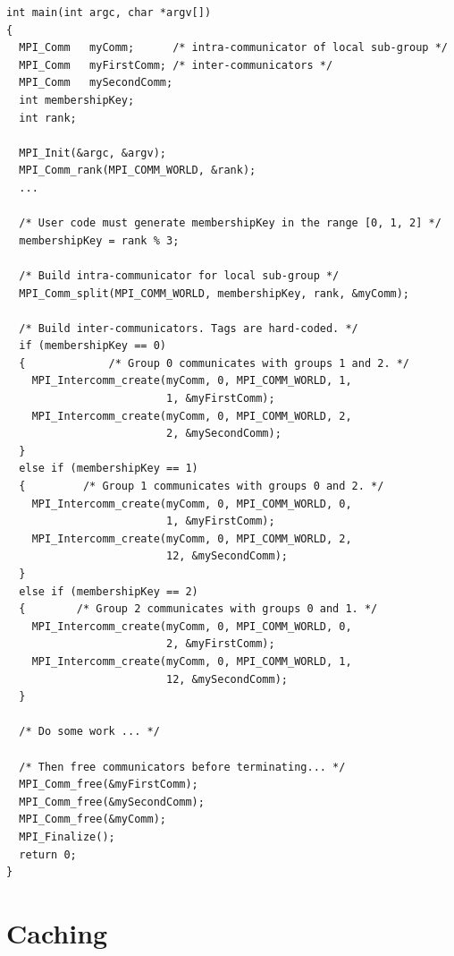 \begin{example}
%
\begin{lstlisting}[language={[MPI]C}]
int main(int argc, char *argv[])
{
  MPI_Comm   myComm;      /* intra-communicator of local sub-group */
  MPI_Comm   myFirstComm; /* inter-communicators */
  MPI_Comm   mySecondComm;
  int membershipKey;
  int rank;

  MPI_Init(&argc, &argv);
  MPI_Comm_rank(MPI_COMM_WORLD, &rank);
  ...

  /* User code must generate membershipKey in the range [0, 1, 2] */
  membershipKey = rank % 3;

  /* Build intra-communicator for local sub-group */
  MPI_Comm_split(MPI_COMM_WORLD, membershipKey, rank, &myComm);

  /* Build inter-communicators. Tags are hard-coded. */
  if (membershipKey == 0)
  {             /* Group 0 communicates with groups 1 and 2. */
    MPI_Intercomm_create(myComm, 0, MPI_COMM_WORLD, 1,
                         1, &myFirstComm);
    MPI_Intercomm_create(myComm, 0, MPI_COMM_WORLD, 2,
                         2, &mySecondComm);
  }
  else if (membershipKey == 1)
  {         /* Group 1 communicates with groups 0 and 2. */
    MPI_Intercomm_create(myComm, 0, MPI_COMM_WORLD, 0,
                         1, &myFirstComm);
    MPI_Intercomm_create(myComm, 0, MPI_COMM_WORLD, 2,
                         12, &mySecondComm);
  }
  else if (membershipKey == 2)
  {        /* Group 2 communicates with groups 0 and 1. */
    MPI_Intercomm_create(myComm, 0, MPI_COMM_WORLD, 0,
                         2, &myFirstComm);
    MPI_Intercomm_create(myComm, 0, MPI_COMM_WORLD, 1,
                         12, &mySecondComm);
  }

  /* Do some work ... */

  /* Then free communicators before terminating... */
  MPI_Comm_free(&myFirstComm);
  MPI_Comm_free(&mySecondComm);
  MPI_Comm_free(&myComm);
  MPI_Finalize();
  return 0;
}
\end{lstlisting}
\end{example}
  
\section{Caching} 
\label{sec:caching}

